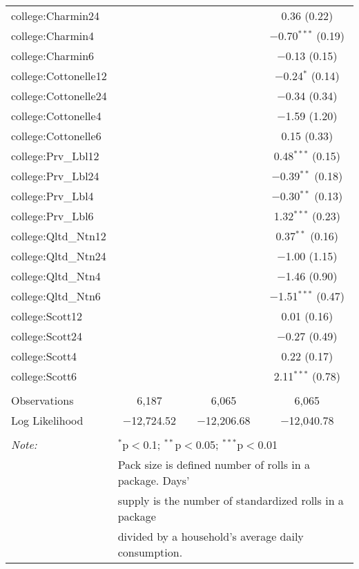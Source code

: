 \begin{table}[!htbp]
\begin{tabular}{@{\extracolsep{5pt}}lccc}
  college:Charmin24 &  &  & 0.36 (0.22) \\ 
  college:Charmin4 &  &  & $-$0.70$^{***}$ (0.19) \\ 
  college:Charmin6 &  &  & $-$0.13 (0.15) \\ 
  college:Cottonelle12 &  &  & $-$0.24$^{*}$ (0.14) \\ 
  college:Cottonelle24 &  &  & $-$0.34 (0.34) \\ 
  college:Cottonelle4 &  &  & $-$1.59 (1.20) \\ 
  college:Cottonelle6 &  &  & 0.15 (0.33) \\ 
  college:Prv\_Lbl12 &  &  & 0.48$^{***}$ (0.15) \\ 
  college:Prv\_Lbl24 &  &  & $-$0.39$^{**}$ (0.18) \\ 
  college:Prv\_Lbl4 &  &  & $-$0.30$^{**}$ (0.13) \\ 
  college:Prv\_Lbl6 &  &  & 1.32$^{***}$ (0.23) \\ 
  college:Qltd\_Ntn12 &  &  & 0.37$^{**}$ (0.16) \\ 
  college:Qltd\_Ntn24 &  &  & $-$1.00 (1.15) \\ 
  college:Qltd\_Ntn4 &  &  & $-$1.46 (0.90) \\ 
  college:Qltd\_Ntn6 &  &  & $-$1.51$^{***}$ (0.47) \\ 
  college:Scott12 &  &  & 0.01 (0.16) \\ 
  college:Scott24 &  &  & $-$0.27 (0.49) \\ 
  college:Scott4 &  &  & 0.22 (0.17) \\ 
  college:Scott6 &  &  & 2.11$^{***}$ (0.78) \\ 
 \hline \\[-1.8ex] 
Observations & 6,187 & 6,065 & 6,065 \\ 
Log Likelihood & $-$12,724.52 & $-$12,206.68 & $-$12,040.78 \\ 
\hline 
\hline \\[-1.8ex] 
\textit{Note:}  & \multicolumn{3}{l}{$^{*}$p$<$0.1; $^{**}$p$<$0.05; $^{***}$p$<$0.01} \\ 
 & \multicolumn{3}{l}{Pack size is defined number of rolls in a package. Days' } \\ 
 & \multicolumn{3}{l}{supply is the number of standardized rolls in a package} \\ 
 & \multicolumn{3}{l}{divided by a household's average daily consumption.} \\ 
\end{tabular} 
\end{table} 
